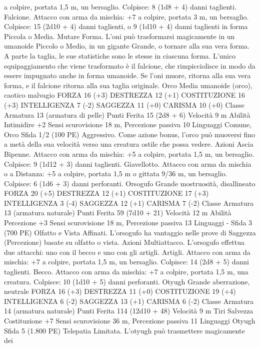 \begin{multicols}{2}
a colpire, portata 1,5 m, un bersaglio.
Colpisce: 8 (1d8 + 4) danni taglienti.
Falcione. Attacco con arma da mischia: +7 a colpire, portata 3
m, un bersaglio.
Colpisce: 15 (2d10 + 4) danni taglienti, o 9 (1d10 + 4) danni
taglienti in forma Piccola o Media.
Mutare Forma. L’oni può trasformarsi magicamente in un
umanoide Piccolo o Medio, in un gigante Grande, o tornare alla sua
vera forma. A parte la taglia, le sue statistiche sono le stesse in
ciascuna forma. L’unico equipaggiamento che viene trasformato è il
falcione, che rimpicciolisce in modo da essere impugnato anche in
forma umanoide. Se l’oni muore, ritorna alla sua vera forma, e il
falcione ritorna alla sua taglia originale.
Orco
Media umanoide (orco), caotico malvagio
FORZA 16 (+3)
DESTREZZA 12 (+1)
COSTITUZIONE 16 (+3)
INTELLIGENZA 7 (-2)
SAGGEZZA 11 (+0)
CARISMA 10 (+0)
Classe Armatura 13 (armatura di pelle)
Punti Ferita 15 (2d8 + 6)
Velocità 9 m
Abilità Intimidire +2
Sensi scurovisione 18 m, Percezione passiva 10
Linguaggi Comune, Orco
Sfida 1/2 (100 PE)
Aggressivo. Come azione bonus, l’orco può muoversi fino a
metà della sua velocità verso una creatura ostile che possa
vedere.
Azioni
Ascia Bipenne. Attacco con arma da mischia: +5 a colpire,
portata 1,5 m, un bersaglio.
Colpisce: 9 (1d12 + 3) danni taglienti.
Giavellotto. Attacco con arma da mischia o a Distanza: +5 a
colpire, portata 1,5 m o gittata 9/36 m, un bersaglio.
Colpisce: 6 (1d6 + 3) danni perforanti.
Orsogufo
Grande mostruosità, disallineato
FORZA 20 (+5)
DESTREZZA 12 (+1)
COSTITUZIONE 17 (+3)
INTELLIGENZA 3 (-4)
SAGGEZZA 12 (+1)
CARISMA 7 (-2)
Classe Armatura 13 (armatura naturale)
Punti Ferita 59 (7d10 + 21)
Velocità 12 m
Abilità Percezione +3
Sensi scurovisione 18 m, Percezione passiva 13
Linguaggi -
Sfida 3 (700 PE)
Olfatto e Vista Affinati. L’orsogufo ha vantaggio nelle prove di
Saggezza (Percezione) basate su olfatto o vista.
Azioni
Multiattacco. L’orsogufo effettua due attacchi: uno con il becco
e uno con gli artigli.
Artigli. Attacco con arma da mischia: +7 a colpire, portata 1,5
m, un bersaglio.
Colpisce: 14 (2d8 + 5) danni taglienti.
Becco. Attacco con arma da mischia: +7 a colpire, portata 1,5 m,
una creatura.
Colpisce: 10 (1d10 + 5) danni perforanti.
Otyugh
Grande aberrazione, neutrale
FORZA 16 (+3)
DESTREZZA 11 (+0)
COSTITUZIONE 19 (+4)
INTELLIGENZA 6 (-2)
SAGGEZZA 13 (+1)
CARISMA 6 (-2)
Classe Armatura 14 (armatura naturale)
Punti Ferita 114 (12d10 + 48)
Velocità 9 m
Tiri Salvezza Costituzione +7
Sensi scurovisione 36 m, Percezione passiva 11
Linguaggi Otyugh
Sfida 5 (1.800 PE)
Telepatia Limitata. L’otyugh può trasmettere magicamente dei

\end{multicols}
